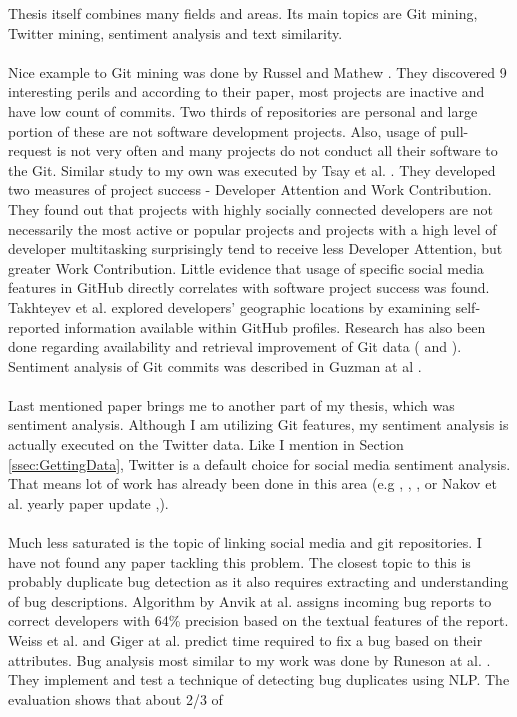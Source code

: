Thesis itself combines many fields and areas. Its main topics are Git mining, Twitter mining, sentiment analysis and text similarity.\\
\\
Nice example to Git mining was done by Russel and Mathew \cite{russell2013mining}. They discovered 9 interesting perils and according to their paper, most projects are inactive and have low count of commits. Two thirds of repositories are personal and large portion of these are not software development projects. Also, usage of pull-request is not very often and many projects do not conduct all their software to the Git. Similar study to my own was executed by Tsay et al. \cite{tsay2012social}. They developed two measures of project success - Developer Attention and Work
Contribution. They found out that projects with highly socially connected developers are not necessarily the most
active or popular projects and projects with a high level of developer multitasking surprisingly tend to receive less
Developer Attention, but greater Work Contribution. Little evidence that usage of specific social media features in GitHub directly correlates with software project success was found.  Takhteyev et al. \cite{takhteyev2010investigating} explored developers' geographic locations by examining self-reported information available within GitHub profiles. Research has also been done regarding availability and retrieval improvement of Git data (\cite{wagstrom2013network} and \cite{gousios2012ghtorrent}). Sentiment analysis of Git commits was described in Guzman at al \cite{guzman2014sentiment}.\\
\\
Last mentioned paper brings me to another part of my thesis, which was sentiment analysis. Although I am utilizing Git features, my sentiment analysis is actually executed on the Twitter data. Like I mention in Section \ref{ssec:GettingData}, Twitter is a default choice for social media sentiment analysis. That means lot of work has already been done in this area (e.g \cite{agarwal2011sentiment}, \cite{kouloumpis2011twitter}, \cite{pak2010twitter}, \cite{saif2012semantic} or Nakov et al. yearly paper update \cite{nakov2016semeval},\cite{rosenthal2017semeval}).\\
\\
Much less saturated is the topic of linking social media and  git repositories. I have not found any paper tackling this problem. The closest topic to this is probably duplicate bug detection as it also requires extracting and understanding of bug descriptions. Algorithm by Anvik at al. \cite{anvik2005coping} assigns incoming bug reports to correct developers with 64\% precision based on the textual features of the report. Weiss et al. \cite{weiss2007long} and Giger at al. \cite{giger2010predicting} predict time required to fix a bug based on their attributes. Bug analysis most similar to my work was done by Runeson at al. \cite{runeson2007detection}. They implement and test a technique of detecting bug duplicates using NLP. The evaluation shows that about 2/3 of
